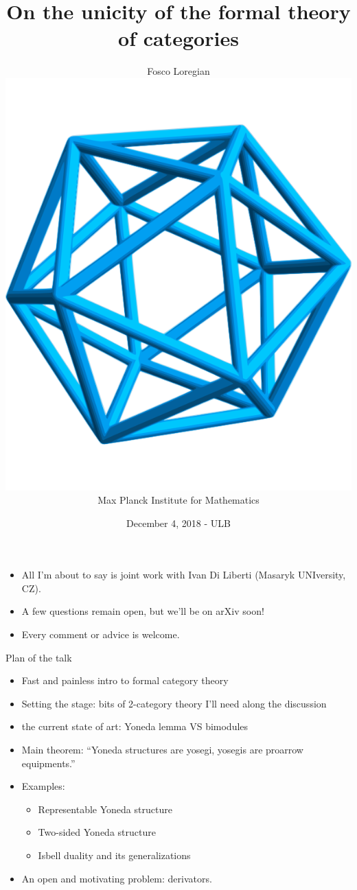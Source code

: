 \documentclass{beamer}
\author[Fosco Loregian]{Fosco Loregian \\ \includegraphics[scale=.05]{MPIM.png} \\ Max Planck Institute for Mathematics}
\title[Unicity]{On the unicity of the formal theory of categories}
\date{December 4, 2018 - ULB}
\begin{document}
\begin{frame}
	\maketitle
\end{frame}

\begin{frame}
	\begin{itemize}
		\item<1-> All I'm about to say is joint work with \alert{Ivan Di Liberti} (Masaryk UNIversity, CZ).
		\item<2-> A few questions remain open, but we'll be on arXiv soon!
		\item<3-> Every comment or advice is welcome.
	\end{itemize}
\end{frame}

\begin{frame}{Plan of the talk}
	\begin{itemize}
		\item<1-> Fast and painless intro to formal category theory
		\item<2-> Setting the stage: bits of 2-category theory I'll need along the discussion
		\item<3-> the current state of art: Yoneda lemma VS bimodules
		\item<4-> \alert{Main theorem}: ``Yoneda structures are yosegi, yosegis are proarrow equipments.''
		\item<5-> Examples:
		      \begin{itemize}
			      \item Representable Yoneda structure
			      \item Two-sided Yoneda structure
			      \item Isbell duality and its generalizations
		      \end{itemize}
		\item<6-> An open and motivating problem: derivators.
	\end{itemize}
\end{frame}
\end{document}
